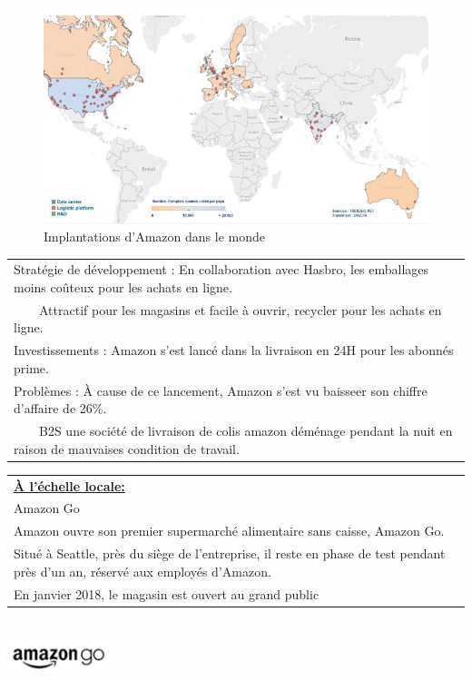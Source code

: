 \documentclass[12pt]{article}
\begin{document}
\begin{figure}[h]\captionsetup{format=sanslabel}
\begin{center}
\includegraphics[width=20cm]{cate_2.jpg}
\caption{Implantations d'Amazon dans le monde}
\end{center}
\end{figure}
\begin{tabular}{l}
 \rowcolor[RGB]{248,157,48} Stratégie de développement :  En collaboration avec Hasbro, les emballages moins coûteux pour les achats en ligne. \\
 \rowcolor[RGB]{248,157,48} ~~~~Attractif pour les magasins et facile à ouvrir, recycler pour les achats en ligne.\\
 \rowcolor[RGB]{248,157,48} Investissements : Amazon s'est lancé dans la livraison en 24H pour les abonnés prime.\\
 \rowcolor[RGB]{248,157,48} Problèmes : \`A cause de ce lancement, Amazon s'est vu baisseer son chiffre d'affaire de 26\%.\\
 \rowcolor[RGB]{248,157,48} ~~~~B2S une société de livraison de colis amazon déménage pendant la nuit en raison de mauvaises condition de travail.\\
\end{tabular}
    \vspace{0.2 cm}

\begin{tabular}{l}
 \rowcolor[RGB]{248,157,48} \textbf{\underline{\`A l'échelle locale:}}\\
\rowcolor[RGB]{248,157,48}Amazon Go\\
\rowcolor[RGB]{248,157,48} Amazon ouvre son premier supermarché alimentaire sans caisse, Amazon Go.\\
\rowcolor[RGB]{248,157,48}  Situé à Seattle, près du siège de l'entreprise, il reste en phase de test pendant près d'un an, réservé aux employés d'Amazon.\\

\rowcolor[RGB]{248,157,48} En janvier 2018, le magasin est ouvert au grand public\\
\end{tabular}\\
\includegraphics[width=3cm]{amazongo.png}
\end{document}
